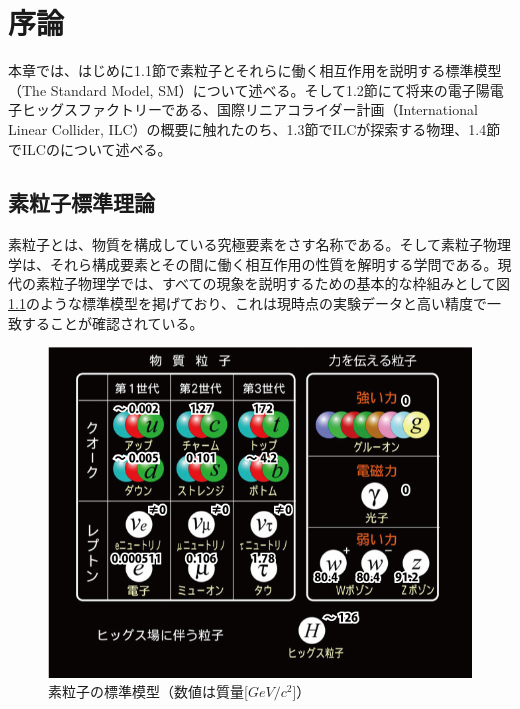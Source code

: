 
\chapter{序論} \label{sec:Intruduction}
本章では、はじめに1.1節で素粒子とそれらに働く相互作用を説明する標準模型（The Standard Model, SM）について述べる。そして1.2節にて将来の電子陽電子ヒッグスファクトリーである、国際リニアコライダー計画（International Linear Collider, ILC）の概要に触れたのち、1.3節でILCが探索する物理、1.4節でILCのについて述べる。
\section{素粒子標準理論}
素粒子とは、物質を構成している究極要素をさす名称である。そして素粒子物理学は、それら構成要素とその間に働く相互作用の性質を解明する学問である。現代の素粒子物理学では、すべての現象を説明するための基本的な枠組みとして図\ref{sm}のような標準模型を掲げており、これは現時点の実験データと高い精度で一致することが確認されている。\\
\begin{figure}[ht]
	\begin{center}
 \includegraphics[keepaspectratio, scale=0.4]
 	{Figure/Introduction/sm.jpg}
 		\caption{素粒子の標準模型（数値は質量[$GeV/c^2$]）}
 		\label{sm}
	\end{center}
\end{figure}
